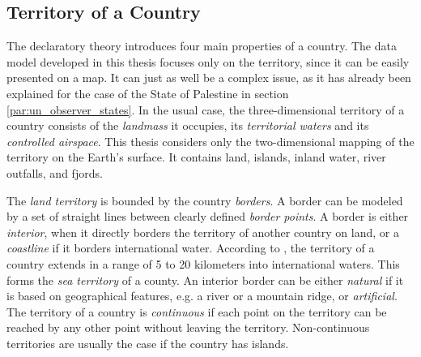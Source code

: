 
\subsection{Territory of a Country} %
\label{sub:territory_of_a_country}

The declaratory theory introduces four main properties of a country. The data model developed in this thesis focuses only on the territory, since it can be easily presented on a map. It can just as well be a complex issue, as it has already been explained for the case of the State of Palestine in section \ref{par:un_observer_states}. In the usual case, the three-dimensional territory of a country consists of the \emph{landmass} it occupies, its \emph{territorial waters} and its \emph{controlled airspace}. This thesis considers only the two-dimensional mapping of the territory on the Earth's surface. It contains land, islands, inland water, river outfalls, and fjords.

The \emph{land territory} is bounded by the country \emph{borders}. A border can be modeled by a set of straight lines between clearly defined \emph{border points}.
A border is either \emph{interior}, when it directly borders the territory of another country on land, or a \emph{coastline} if it borders international water. According to \cite{UNSeaBorders}, the territory of a country extends in a range of 5 to 20 kilometers into international waters. This forms the \emph{sea territory} of a county.
An interior border can be either \emph{natural} if it is based on geographical features, e.g. a river or a mountain ridge, or \emph{artificial}.
The territory of a country is \emph{continuous} if each point on the territory can be reached by any other point without leaving the territory. Non-continuous territories are usually the case if the country has islands.

